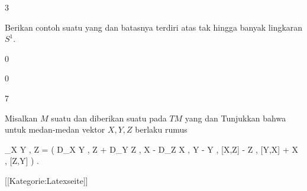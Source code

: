 {3}
{

Berikan contoh suatu
yang
dan batasnya terdiri atas
 {} {}
tak hingga banyak lingkaran $S^1$.

}
{} {}

{0}
{

}
{} {}

{0}
{

}
{} {}

{7}
{

Misalkan $M$ suatu
dan diberikan suatu
pada
$TM$ yang
dan
Tunjukkan bahwa untuk medan-medan vektor $X,Y,Z$ berlaku rumus

\mavergleichskettedisp
{\vergleichskette
{ \left\langle \nabla_X Y , Z  \right\rangle
}
{ =} { {  }  \left(  D_X \left\langle  Y  ,  Z  \right\rangle +  D_Y \left\langle  Z  ,  X  \right\rangle -  D_Z \left\langle  X  ,  Y  \right\rangle  - \left\langle  Y  , [X,Z]   \right\rangle - \left\langle  Z  , [Y,X]   \right\rangle + \left\langle  X  , [Z,Y]   \right\rangle   \right)
}
{ } {
}
{ } {
}
{ } {
}
}
{}{}{.}

}
{} {}

 [[Kategorie:Latexseite]]
